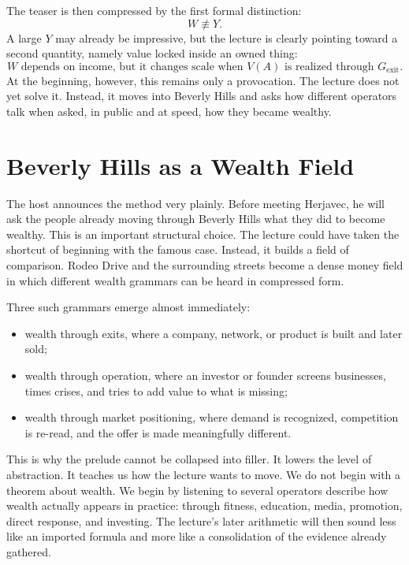 The teaser is then compressed by the first formal distinction:
\begin{equation}
W \not\equiv Y.
\end{equation}
A large \(Y\) may already be impressive, but the lecture is clearly pointing toward a second quantity, namely value locked inside an owned thing:
\begin{equation}
W \text{ depends on income, but it changes scale when } V(A) \text{ is realized through } G_{\mathrm{exit}}.
\end{equation}
At the beginning, however, this remains only a provocation. The lecture does not yet solve it. Instead, it moves into Beverly Hills and asks how different operators talk when asked, in public and at speed, how they became wealthy.

\section{Beverly Hills as a Wealth Field}

The host announces the method very plainly. Before meeting Herjavec, he will ask the people already moving through Beverly Hills what they did to become wealthy. This is an important structural choice. The lecture could have taken the shortcut of beginning with the famous case. Instead, it builds a field of comparison. Rodeo Drive and the surrounding streets become a dense money field in which different wealth grammars can be heard in compressed form.

Three such grammars emerge almost immediately:
\begin{itemize}
\item wealth through exits, where a company, network, or product is built and later sold;
\item wealth through operation, where an investor or founder screens businesses, times crises, and tries to add value to what is missing;
\item wealth through market positioning, where demand is recognized, competition is re-read, and the offer is made meaningfully different.
\end{itemize}

This is why the prelude cannot be collapsed into filler. It lowers the level of abstraction. It teaches us how the lecture wants to move. We do not begin with a theorem about wealth. We begin by listening to several operators describe how wealth actually appears in practice: through fitness, education, media, promotion, direct response, and investing. The lecture's later arithmetic will then sound less like an imported formula and more like a consolidation of the evidence already gathered.

